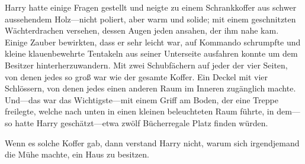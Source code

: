 Harry hatte einige Fragen gestellt und neigte zu einem Schrankkoffer aus schwer aussehendem Holz—nicht poliert, aber warm und solide; mit einem geschnitzten Wächterdrachen versehen, dessen Augen jeden ansahen, der ihm nahe kam. Einige Zauber bewirkten, dass er sehr leicht war, auf Kommando schrumpfte und kleine klauenbewehrte Tentakeln aus seiner Unterseite ausfahren konnte um dem Besitzer hinterherzuwandern. Mit zwei Schubfächern auf jeder der vier Seiten, von denen jedes so groß war wie der gesamte Koffer. Ein Deckel mit vier Schlössern, von denen jedes einen anderen Raum im Inneren zugänglich machte. Und—das war das Wichtigste—mit einem Griff am Boden, der eine Treppe freilegte, welche nach unten in einen kleinen beleuchteten Raum führte, in dem—so hatte Harry geschätzt—etwa zwölf Bücherregale Platz finden würden.

Wenn es solche Koffer gab, dann verstand Harry nicht, warum sich irgendjemand die Mühe machte, ein Haus zu besitzen.

